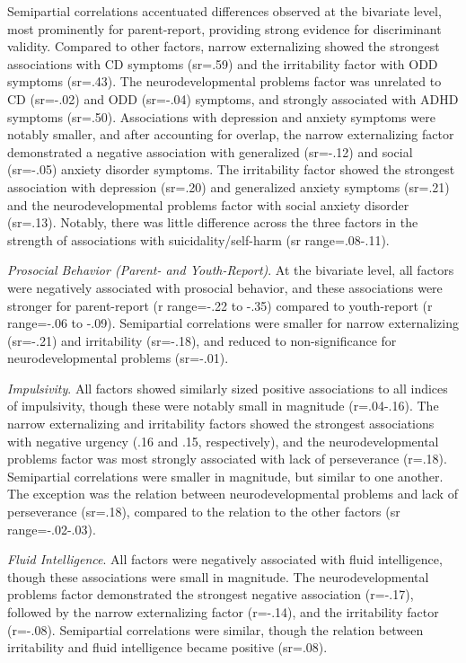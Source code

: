 \documentclass[
  20pt,
  number,
  preprint,
  3p,
  twocolumn]{elsarticle}
\begin{document}
Semipartial correlations accentuated differences observed at the
bivariate level, most prominently for parent-report, providing strong
evidence for discriminant validity. Compared to other factors, narrow
externalizing showed the strongest associations with CD symptoms
(sr=.59) and the irritability factor with ODD symptoms (sr=.43). The
neurodevelopmental problems factor was unrelated to CD (sr=-.02) and ODD
(sr=-.04) symptoms, and strongly associated with ADHD symptoms (sr=.50).
Associations with depression and anxiety symptoms were notably smaller,
and after accounting for overlap, the narrow externalizing factor
demonstrated a negative association with generalized (sr=-.12) and
social (sr=-.05) anxiety disorder symptoms. The irritability factor
showed the strongest association with depression (sr=.20) and
generalized anxiety symptoms (sr=.21) and the neurodevelopmental
problems factor with social anxiety disorder (sr=.13). Notably, there
was little difference across the three factors in the strength of
associations with suicidality/self-harm (sr range=.08-.11).

\emph{Prosocial Behavior (Parent- and Youth-Report)}. At the bivariate
level, all factors were negatively associated with prosocial behavior,
and these associations were stronger for parent-report (r range=-.22 to
-.35) compared to youth-report (r range=-.06 to -.09). Semipartial
correlations were smaller for narrow externalizing (sr=-.21) and
irritability (sr=-.18), and reduced to non-significance for
neurodevelopmental problems (sr=-.01).

\emph{Impulsivity}. All factors showed similarly sized positive
associations to all indices of impulsivity, though these were notably
small in magnitude (r=.04-.16). The narrow externalizing and
irritability factors showed the strongest associations with negative
urgency (.16 and .15, respectively), and the neurodevelopmental problems
factor was most strongly associated with lack of perseverance (r=.18).
Semipartial correlations were smaller in magnitude, but similar to one
another. The exception was the relation between neurodevelopmental
problems and lack of perseverance (sr=.18), compared to the relation to
the other factors (sr range=-.02-.03).

\emph{Fluid Intelligence}. All factors were negatively associated with
fluid intelligence, though these associations were small in magnitude.
The neurodevelopmental problems factor demonstrated the strongest
negative association (r=-.17), followed by the narrow externalizing
factor (r=-.14), and the irritability factor (r=-.08). Semipartial
correlations were similar, though the relation between irritability and
fluid intelligence became positive (sr=.08).
\end{document}
